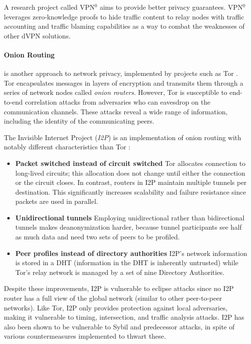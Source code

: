A research project called VPN$^0$ \cite{vpn0} aims to provide better privacy guarantees. VPN$^0$ leverages zero-knowledge proofs to hide traffic content to relay nodes with traffic accounting and traffic blaming capabilities as a way to combat the weaknesses of other dVPN solutions.

\paragraph{Onion Routing} is another approach to network privacy, implemented by projects such as Tor \cite{tor}. Tor encapsulates messages in layers of encryption and transmits them through a series of network nodes called \textit{onion routers}. However, Tor is susceptible to end-to-end correlation attacks from adversaries who can eavesdrop on the communication channels. These attacks reveal a wide range of information, including the identity of the communicating peers.

The Invisible Internet Project (\textit{I2P}) is an implementation of onion routing with notably different characteristics than Tor \cite{i2p}:

\begin{itemize}

    \item \textbf{Packet switched instead of circuit switched}
          Tor allocates connection to long-lived circuits; this allocation does not change until either the connection or the circuit closes. In contrast, routers in I2P maintain multiple tunnels per destination. This significantly increases scalability and failure resistance since packets are used in parallel.

    \item \textbf{Unidirectional tunnels}
          Employing unidirectional rather than bidirectional tunnels makes deanonymization harder, because tunnel participants see half as much data and need two sets of peers to be profiled.

    \item \textbf{Peer profiles instead of directory authorities}
          I2P’s network information is stored in a DHT (information in the DHT is inherently untrusted) while Tor’s relay network is managed by a set of nine Directory Authorities.
\end{itemize}

Despite these improvements, I2P is vulnerable to eclipse attacks since no I2P router has a full view of the global network (similar to other peer-to-peer networks). Like Tor, I2P only provides protection against local adversaries, making it vulnerable to timing, intersection, and traffic analysis attacks. I2P has also been shown to be vulnerable to Sybil and predecessor attacks, in spite of various countermeasures implemented to thwart these.

